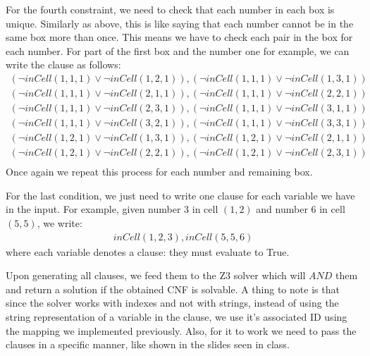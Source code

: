 \documentclass[12pt,a4paper]{article}
\begin{document}
For the fourth constraint, we need to check that each number in each box is unique. Similarly as above, this is like saying that each number cannot be in the same box more than once. This means we have to check each pair in the box for each number. For part of the first box and the number one for example, we can write the clause as follows:
\begin{align*}
  (\neg inCell(1,1,1) \vee \neg inCell(1,2,1)) ,  (\neg inCell(1,1,1) \vee \neg inCell(1,3,1))  \\
  (\neg inCell(1,1,1) \vee \neg inCell(2,1,1)) , (\neg inCell(1,1,1) \vee \neg inCell(2,2,1)) \\
  (\neg inCell(1,1,1) \vee \neg inCell(2,3,1)) , (\neg inCell(1,1,1) \vee \neg inCell(3,1,1)) \\
  (\neg inCell(1,1,1) \vee \neg inCell(3,2,1)) , (\neg inCell(1,1,1) \vee \neg inCell(3,3,1)) \\
  (\neg inCell(1,2,1) \vee \neg inCell(1,3,1)) ,  (\neg inCell(1,2,1) \vee \neg inCell(2,1,1)) \\
  (\neg inCell(1,2,1) \vee \neg inCell(2,2,1)) , (\neg inCell(1,2,1)\vee \neg inCell(2,3,1)) \\
\end{align*}
Once again we repeat this process for each number and remaining box.
\medskip

For the last condition, we just need to write one clause for each variable we have in the input. For example, given number 3 in cell $(1,2)$ and number 6 in cell $(5,5)$, we write:
\begin{align*}
  inCell(1,2,3) , inCell(5,5,6)
\end{align*}
where each variable denotes a clause: they must evaluate to True.

\medskip

Upon generating all clauses, we feed them to the Z3 solver which will $AND$ them and return a solution if the obtained CNF is solvable.
A thing to note is that since the solver works with indexes and not with strings, instead of using the string representation of a variable in the clause, we use it's associated ID using the mapping we implemented previously.
Also, for it to work we need to pass the clauses in a specific manner, like shown in the slides seen in class.
\end{document}
